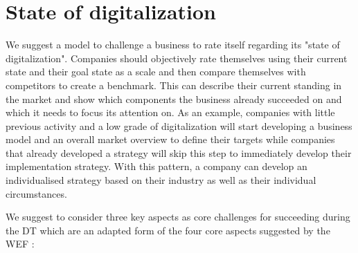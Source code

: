 \section{State of digitalization}
We suggest a model to challenge a business to rate itself regarding its "state of digitalization". Companies should objectively rate themselves using their current state and their goal state as a scale and then compare themselves with competitors to create a benchmark. This can describe their current standing in the market and show which components the business already succeeded on and which it needs to focus its attention on. As an example, companies with little previous activity and a low grade of digitalization will start developing a business model and an overall market overview to define their targets while companies that already developed a strategy will skip this step to immediately develop their implementation strategy. With this pattern, a company can develop an individualised strategy based on their industry as well as their individual circumstances.

We suggest to consider three key aspects as core challenges for succeeding during the \ac{DT} which are an adapted form of the four core aspects suggested by the \ac{WEF} \cite{worldforumdigitalenterprise:2016}:



